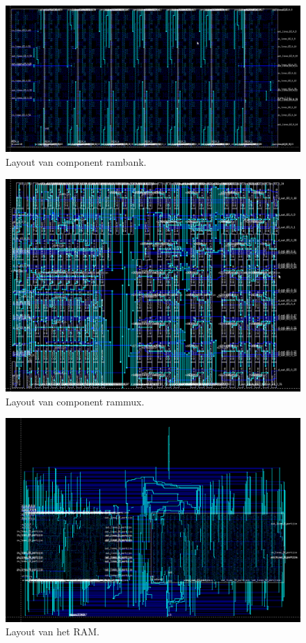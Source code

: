 \documentclass{scrartcl}  %
\begin{document}
\begin{figure}[H]
\centering
		\includegraphics[width=\textwidth]{resource/rambank}
		\caption{Layout van component rambank.}
		\label{fig:layout-rambank}
\end{figure}
\begin{figure}[H]
\centering
		\includegraphics[width=\textwidth]{resource/rammux}
		\caption{Layout van component rammux.}
		\label{fig:layout-rammux}
\end{figure}
\begin{figure}[H]
\centering
		\includegraphics[width=\textwidth]{resource/ram}
		\caption{Layout van het RAM.}
		\label{fig:layout-ram}
\end{figure}
\end{document}
